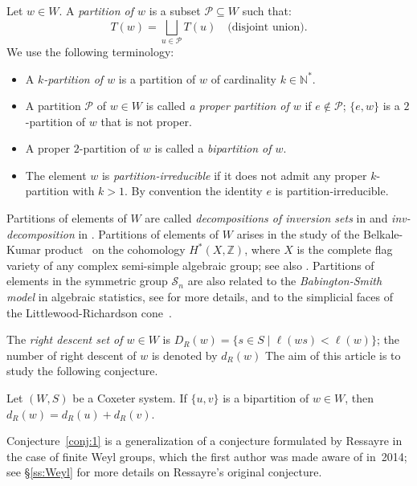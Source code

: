 \documentclass[Unicode]{cedram-alco}
\theoremstyle{definition}
\begin{document}
\begin{defi}\label{def:1} Let $w\in W$. A {\em partition of $w$} is a subset $\mathcal P\subseteq W$ such that:
$$
T(w)=\bigsqcup_{u\in \mathcal P} T(u) \quad\textrm{(disjoint union)}.
$$
We use the following terminology:
\begin{itemize}
\item A {\em $k$-partition of $w$} is a partition of $w$ of cardinality $k\in\mathbb N^*$. 
\item A partition $\mathcal P$ of $w\in W$ is called {\em a proper partition of $w$} if $e\notin \mathcal P$; $\{e,w\}$ is a $2$-partition of $w$ that is not proper.
\item A proper $2$-partition of $w$ is called a {\em bipartition of $w$}. 
\item The element $w$ is {\em partition-irreducible} if it does not admit any proper $k$-partition with $k>1$. By convention the identity $e$ is partition-irreducible. 
\end{itemize}
\end{defi}


Partitions of elements of $W$ are called {\em decompositions of inversion sets} in \cite{DeDiRo17} and {\em inv-decomposition} in \cite{Ka13}. Partitions of elements of $W$ arises in the study of the Belkale-Kumar product~\cite{BeKu06} on the cohomology $H^*(X,\mathbb Z)$, where $X$ is  the complete flag variety of any complex semi-simple algebraic group; see also \cite{DiRo09,DiRo17}. Partitions of elements in the symmetric group $\mathcal S_n$ are also related to the {\em Babington-Smith model} in algebraic statistics, see \cite{Ka13} for more details, and to the simplicial faces of the Littlewood-Richardson cone~\cite{DeDiRo17}.




 The {\em right descent set of $w\in W$} is $D_R(w)=\{s\in S \mid \ell(ws)<\ell(w)\}$; the number of right descent of $w$ is  denoted by $d_R(w)$  The aim of this article is to study the following conjecture. 

\begin{conj}\label{conj:1}  Let  $(W,S)$ be a Coxeter system. If  $\{u,v\}$ is a bipartition of $w\in W$, then $d_R(w)=d_R(u)+d_R(v)$. 
\end{conj}

Conjecture~\ref{conj:1} is a generalization of a conjecture formulated by Ressayre in the case of finite Weyl groups, which the first author was made aware of in~2014; see \S\ref{ss:Weyl} for more details on Ressayre's original conjecture.
\end{document}
